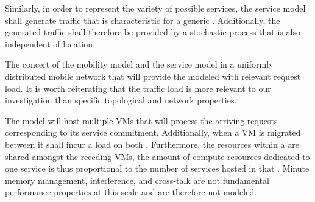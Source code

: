 Similarly, in order to represent the variety of possible services, the service model shall generate traffic that is characteristic for a generic \ue{}. Additionally, the generated traffic shall therefore be provided by a stochastic process that is also independent of location.

The concert of the mobility model and the service model in a uniformly distributed mobile network that will provide the modeled \dcs{} with relevant request load. It is worth reiterating that the traffic load is more relevant to our investigation than specific topological and network properties.

The \dc{} model will host multiple VMs that will process the arriving requests corresponding to its service commitment. Additionally, when a VM is migrated between \dcs{} it shall incur a load on both \dcs{}. Furthermore, the resources within a \dc{} are shared amongst the receding VMs, the amount of compute resources dedicated to one service is thus proportional to the number of services hosted in that \dc{}.  Minute memory management, interference, and cross-talk are not fundamental performance properties at this scale and are therefore not modeled.
